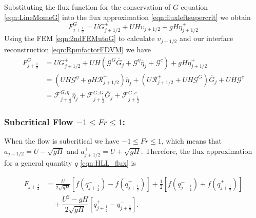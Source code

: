 Substituting the flux function for the conservation of $G$ equation \eqref{eqn:LineMomeG} into the flux approximation \eqref{eqn:fluxleftsupercrit} we obtain
\begin{equation*}
F^G_{j+\frac{1}{2}} =U G^+_{j+1/2} + U  H \upsilon_{j+1/2} + gH \eta^+_{j+1/2}
\end{equation*}
Using the FEM \eqref{eqn:2ndFEMutoG} to calculate $\upsilon_{j+1/2}$ and our interface reconstruction \eqref{eqn:RpmfactorFDVM} we have
\begin{align}
F^G_{j+\frac{1}{2}} &=  U G^+_{j+1/2} + UH \left(\mathcal{G}^G \overline{G}_{j} + \mathcal{G}^{\eta} \overline{\eta}_{j} + \mathcal{G}^c\right) + gH \eta^+_{j+1/2} \nonumber \\ &= \left(UH \mathcal{G}^{\eta} + gH \mathcal{R}^+_{j+1/2} \right)  \overline{\eta}_{j} + \left(U\mathcal{R}^+_{j+1/2}  +  UH \mathcal{G}^G \right) \overline{G}_{j} + UH\mathcal{G}^c \nonumber \\
&= \mathcal{F}^{G, \eta}_{j+\frac{1}{2}} \overline{\eta}_{j} + \mathcal{F}^{G, G}_{j+\frac{1}{2}} \overline{G}_{j} + \mathcal{F}^{G, c}_{j+\frac{1}{2}}
\label{eqn:FluxfactorsupercritGleft}
\end{align}


\subsubsection{Subcritical Flow $-1 \le Fr \le 1$:}
When the flow is subcritical we have $-1\le Fr \le 1$, which means that $a^-_{j+ 1/2} = U - \sqrt{g H}$ and $a^+_{j+ 1/2} =  U + \sqrt{g H}$. Therefore, the flux approximation for a general quantity $q$ \eqref{eqn:HLL_flux} is

\begin{align}
F_{j+\frac{1}{2}} &= \frac{U}{2 \sqrt{gH}} \left[f\left(q^-_{j+\frac{1}{2}}\right) - f\left(q^+_{j+\frac{1}{2}}\right) \right]  + \frac{1}{2}\left[f\left(q^-_{j+\frac{1}{2}}\right) + f\left(q^+_{j+\frac{1}{2}}\right)\right] \nonumber \\ & \quad  + \dfrac{U^2 - gH}{2\sqrt{g H}} \left [ q^+_{j+\frac{1}{2}} - q^-_{j+\frac{1}{2}} \right ].
\label{eqn:fluxsubcrit}
\end{align}

